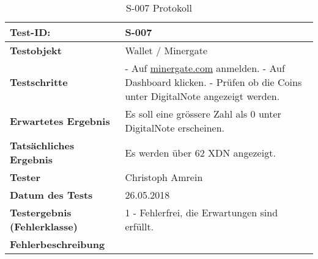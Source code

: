 \begin{table}[H]
\centering
\begin{tabular}{p{4.5cm}p{11.5cm}}
\hline
\cellcolor{heading}\textbf{Test-ID:} & \textbf{S-007} \\\hline
\cellcolor{heading}\textbf{Testobjekt} & Wallet / Minergate\\\hline
\cellcolor{heading}\textbf{Testschritte} & 
- Auf \url{minergate.com} anmelden. \newline
- Auf Dashboard klicken. \newline
- Prüfen ob die Coins unter DigitalNote angezeigt werden.
\\\hline
\cellcolor{heading}\textbf{Erwartetes Ergebnis} & Es soll eine grössere Zahl als 0 unter DigitalNote erscheinen. \\\hline
\cellcolor{heading}\textbf{Tatsächliches Ergebnis} &
Es werden über 62 XDN angezeigt.
 \\\hline
\cellcolor{heading}\textbf{Tester} & Christoph Amrein  \\\hline
\cellcolor{heading}\textbf{Datum des Tests} & 26.05.2018  \\\hline
\cellcolor{heading}\textbf{Testergebnis \newline (Fehlerklasse)} & 1 - Fehlerfrei, die Erwartungen sind erfüllt. \\\hline
\cellcolor{heading}\textbf{Fehlerbeschreibung} & \\\hline
\end{tabular}
\caption{S-007 Protokoll}
\end{table}